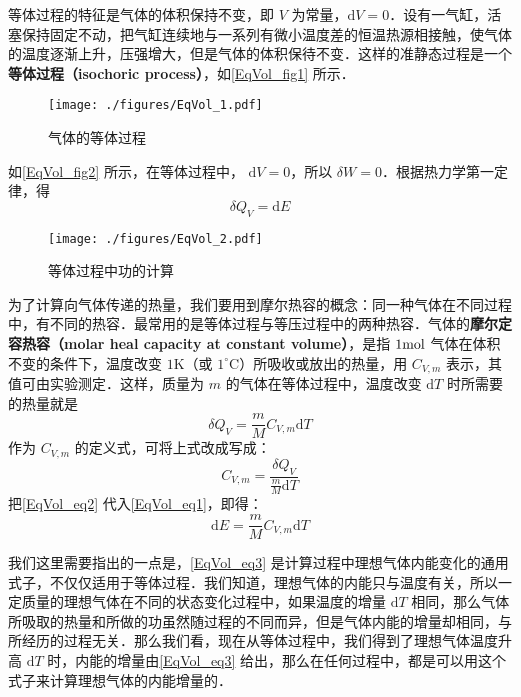 

等体过程的特征是气体的体积保持不变，即 $V $ 为常量，$\mathrm dV=0$．设有一气缸，活塞保持固定不动，把气缸连续地与一系列有微小温度差的恒温热源相接触，使气体的温度逐渐上升，压强增大，但是气体的体积保待不变．这样的准静态过程是一个\textbf{等体过程（isochoric process）}，如\autoref{EqVol_fig1} 所示．
\begin{figure}[ht]
\centering
\texttt{[image: ./figures/EqVol\_1.pdf]}
\caption{气体的等体过程} \label{EqVol_fig1}
\end{figure}
如\autoref{EqVol_fig2} 所示，在等体过程中， $\mathrm dV=0$，所以 $\delta W=0$．根据热力学第一定律，得
\begin{equation} \label{EqVol_eq1}
\delta Q_{V}=\mathrm{d} E 
\end{equation}
\begin{figure}[ht]
\centering
\texttt{[image: ./figures/EqVol\_2.pdf]}
\caption{等体过程中功的计算} \label{EqVol_fig2}
\end{figure}
为了计算向气体传递的热量，我们要用到摩尔热容的概念：同一种气体在不同过程中，有不同的热容．最常用的是等体过程与等压过程中的两种热容．气体的\textbf{摩尔定容热容（molar heal capacity at constant volume）}，是指 $1 \rm mol$ 气体在体积不变的条件下，温度改变 $1\mathrm{K}$（或 $1^\circ \mathrm{C}$）所吸收或放出的热量，用 $C_{V,m}$ 表示，其值可由实验测定．这样，质量为 $m $ 的气体在等体过程中，温度改变 $\mathrm dT $ 时所需要的热量就是
\begin{equation} \label{EqVol_eq2}
\delta Q_{V}=\frac{m}{M} C_{V, {m}} \mathrm{d} T
\end{equation}
作为 $C_{V,m}$ 的定义式，可将上式改成写成：
\begin{equation} 
C_{V, m}=\frac{\delta Q_{V}}{\frac{m}{M} \mathrm{d} T}
\end{equation}
把\autoref{EqVol_eq2} 代入\autoref{EqVol_eq1}，即得：
\begin{equation} \label{EqVol_eq3}
\mathrm{d} E=\frac{m}{M} C_{V, m} \mathrm{d} T
\end{equation}

我们这里需要指出的一点是，\autoref{EqVol_eq3} 是计算过程中理想气体内能变化的通用式子，不仅仅适用于等体过程．我们知道，理想气体的内能只与温度有关，所以一定质量的理想气体在不同的状态变化过程中，如果温度的增量 $\mathrm dT $ 相同，那么气体所吸取的热量和所做的功虽然随过程的不同而异，但是气体内能的增量却相同，与所经历的过程无关．那么我们看，现在从等体过程中，我们得到了理想气体温度升高 $\mathrm dT $ 时，内能的增量由\autoref{EqVol_eq3} 给出，那么在任何过程中，都是可以用这个式子来计算理想气体的内能增量的．

